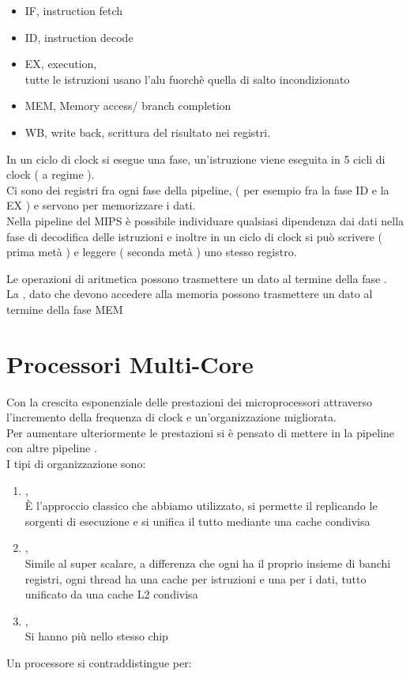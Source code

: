 \documentclass[arch.tex]{subfiles}
\begin{document}
\begin{itemize}
	\item IF, instruction fetch
	\item ID, instruction decode
	\item EX, execution,\\
		tutte le istruzioni usano l'alu fuorchè quella di salto incondizionato
	\item MEM, Memory access/ branch completion
	\item WB, write back, scrittura del risultato nei registri.
\end{itemize}
In un ciclo di clock si esegue una fase, un'istruzione viene eseguita in 5 cicli di clock 
( a regime ).\\
Ci sono dei registri fra ogni fase della pipeline, ( per esempio fra la fase ID e la EX ) e 
servono per memorizzare i dati.\\
Nella pipeline del MIPS è possibile individuare qualsiasi dipendenza dai dati nella fase di 
decodifica delle istruzioni e inoltre in un ciclo di clock si può scrivere ( prima metà ) e
leggere ( seconda metà ) uno stesso registro.

%
\label{ppar:Note per gli esercizi}
Le operazioni di aritmetica  possono trasmettere un dato al termine della fase
.\\
La , dato che devono accedere alla memoria possono trasmettere un dato al 
termine della fase MEM

\section{Processori Multi-Core}%
\label{sec:processori_multi_core}
Con la crescita esponenziale delle prestazioni dei microprocessori attraverso l'incremento 
della frequenza di clock e un'organizzazione migliorata.\\
Per aumentare ulteriormente le prestazioni si è pensato di mettere in  la
pipeline con altre pipeline .\\
I tipi di organizzazione sono:

\begin{enumerate}
	\item {},\\
		È l'approccio classico che abbiamo utilizzato, si permette il
		 replicando le sorgenti di esecuzione e si unifica il tutto
		mediante una cache condivisa
	\item {},\\
		Simile al super scalare, a differenza che ogni  ha il proprio
		insieme di banchi registri, ogni thread ha una cache per istruzioni e una 
		per i dati, tutto unificato da una cache L2 condivisa
	\item {},\\
		Si hanno più  nello stesso chip
\end{enumerate}
Un processore  si contraddistingue per:
\end{document}
